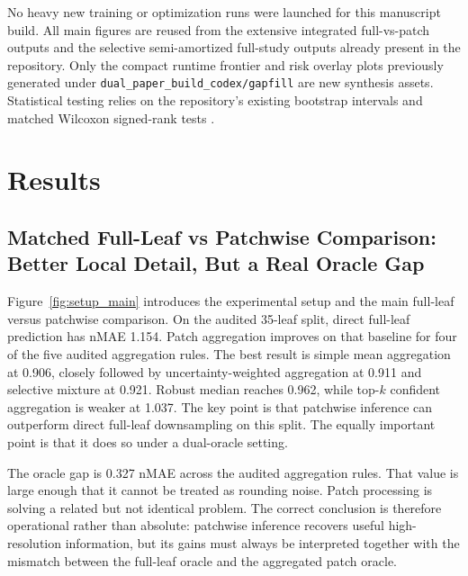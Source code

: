 \documentclass[11pt,a4paper]{article}
\newcommand{\nmae}{nMAE}
\begin{document}
No heavy new training or optimization runs were launched for this manuscript build.
All main figures are reused from the extensive integrated full-vs-patch outputs and the selective semi-amortized full-study outputs already present in the repository.
Only the compact runtime frontier and risk overlay plots previously generated under \texttt{dual\_paper\_build\_codex/gapfill} are new synthesis assets.
Statistical testing relies on the repository's existing bootstrap intervals and matched Wilcoxon signed-rank tests \citep{B_efron1979,B_wilcoxon1945}.

\section{Results}
\subsection{Matched Full-Leaf vs Patchwise Comparison: Better Local Detail, But a Real Oracle Gap}
Figure~\ref{fig:setup_main} introduces the experimental setup and the main full-leaf versus patchwise comparison.
On the audited 35-leaf split, direct full-leaf prediction has \nmae{} 1.154.
Patch aggregation improves on that baseline for four of the five audited aggregation rules.
The best result is simple mean aggregation at 0.906, closely followed by uncertainty-weighted aggregation at 0.911 and selective mixture at 0.921.
Robust median reaches 0.962, while top-$k$ confident aggregation is weaker at 1.037.
The key point is that patchwise inference can outperform direct full-leaf downsampling on this split.
The equally important point is that it does so under a dual-oracle setting.

The oracle gap is 0.327 \nmae{} across the audited aggregation rules.
That value is large enough that it cannot be treated as rounding noise.
Patch processing is solving a related but not identical problem.
The correct conclusion is therefore operational rather than absolute: patchwise inference recovers useful high-resolution information, but its gains must always be interpreted together with the mismatch between the full-leaf oracle and the aggregated patch oracle.
\end{document}
